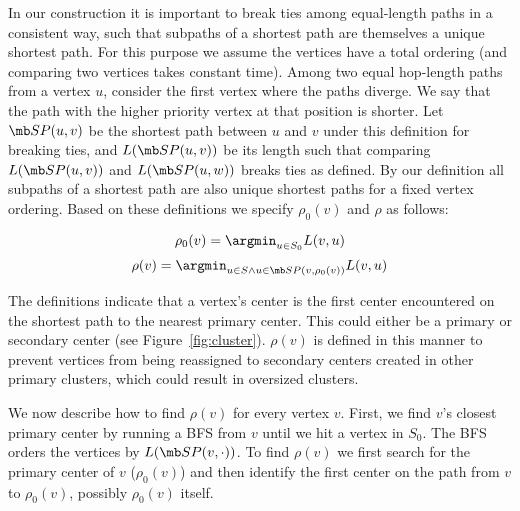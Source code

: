 In our construction it is important to break ties among equal-length
paths in a consistent way, such that subpaths of a shortest path are
themselves a unique shortest path.  For this purpose we assume the
vertices have a total ordering (and comparing two vertices takes
constant time).  Among two equal hop-length paths from a vertex $u$,
consider the first vertex where the paths diverge.  We say that the
path with the higher priority vertex at that position is shorter.  Let
$\p(u,v)$ be the shortest path between $u$ and $v$ under this
definition for breaking ties, and $L(\p(u,v))$ be its length such that
comparing $L(\p(u,v))$ and $L(\p(u,w))$ breaks ties as defined.  By
our definition all subpaths of a shortest path are also unique
shortest paths for a fixed vertex ordering.  Based on these
definitions we specify $\rho_0(v)$ and $\rho$ as follows:

$$\rho_0(v) = \argmin_{u \in S_0} L(v,u)$$
$$\rho(v) = \argmin_{u \in S \wedge u \in {\scriptsize \p}(v,\rho_0(v))} L(v,u)$$

The definitions indicate that a vertex's center is the first center
encountered on the shortest path to the nearest primary center.  This
could either be a primary or secondary center (see
Figure~\ref{fig:cluster}). $\rho(v)$ is defined in this manner to
prevent vertices from being reassigned to secondary centers created in
other primary clusters, which could result in oversized clusters.


We now describe how to find $\rho(v)$ for every vertex $v$.
First, we find $v$'s closest primary center by running a
BFS from $v$ until we hit a vertex in $S_0$. The BFS orders the vertices by $L(\p(v,\cdot))$.
To find $\rho(v)$
we first search for the primary center of $v$ ($\rho_0(v)$) and then
identify the first center on the path from $v$ to $\rho_0(v)$,
possibly $\rho_0(v)$ itself.

